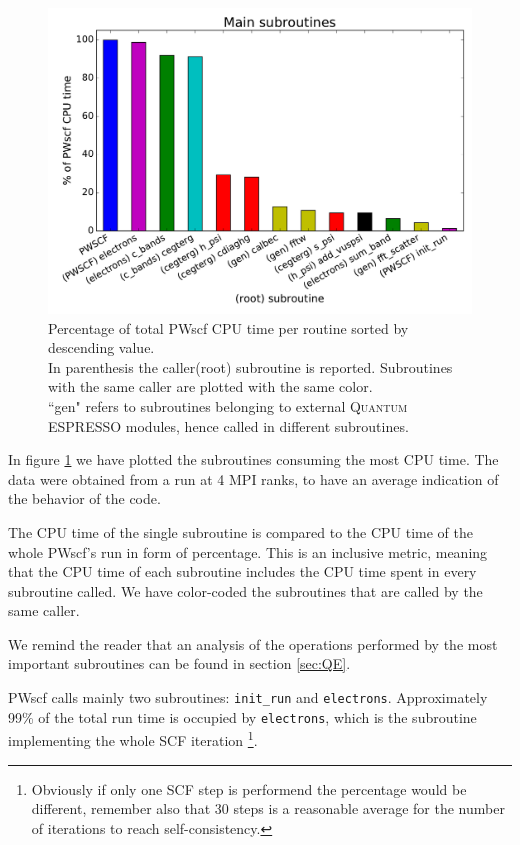 \documentclass[a4paper,12pt]{article}
\newcommand\QE{\textsc{Quantum} ESPRESSO }
\begin{document}
\begin{figure}[hhh!]
\begin{center}
	\includegraphics[width=\linewidth]{main_subroutines.pdf}	
	\caption{Percentage of total PWscf CPU time per routine sorted by descending value. 
	\\In parenthesis the caller(root) subroutine is reported. 
	Subroutines with the same caller are plotted with the same color. 	
	\\``gen" refers to subroutines belonging to external \QE modules, hence called in different subroutines. }
	\label{fig:mainSubroutines}
\end{center}
\end{figure}

In figure \ref{fig:mainSubroutines} we have plotted the subroutines consuming the most CPU time. 
The data were obtained from a run at 4 MPI ranks, to have an average indication of the behavior of the code.

The CPU time of the single subroutine is compared to the CPU time of the whole PWscf's run in form of percentage.
This is an inclusive metric, meaning that the CPU time of each subroutine includes the CPU time spent in every subroutine called.
We have color-coded the subroutines that are called by the same caller.

We remind the reader that an analysis of the operations performed by the most important subroutines can be found in section \ref{sec:QE}.


PWscf calls mainly two subroutines: \texttt{init\_run} and \texttt{electrons}.
Approximately 99\% of the total run time is occupied by \texttt{electrons}, which is the subroutine implementing the whole SCF iteration \footnote{Obviously if only one SCF step is performend the percentage would be different, remember also that 30 steps is a reasonable average for the number of iterations to reach self-consistency. }.
\end{document}
